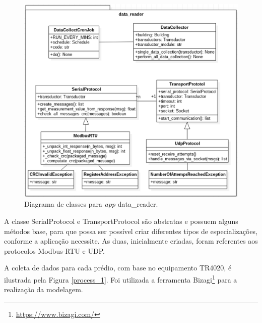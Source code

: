 \begin{figure}[!h]
    \centering
    \includegraphics[keepaspectratio=true,scale=0.7]{figuras/data_reader.eps}
    \caption{Diagrama de classes para \textit{app} data\_reader.}
    \label{data_reader}
\end{figure}

A classe SerialProtocol e TransportProtocol são abstratas e possuem alguns métodos base, para que possa ser possível criar diferentes tipos de especializações, conforme a aplicação necessite. As duas, inicialmente criadas, foram referentes aos protocolos Modbus-RTU e UDP.

A coleta de dados para cada prédio, com base no equipamento TR4020, é ilustrada pela Figura \ref{process_1}. Foi utilizada a ferramenta Bizagi\footnote{\url{https://www.bizagi.com/}} para a realização da modelagem.


